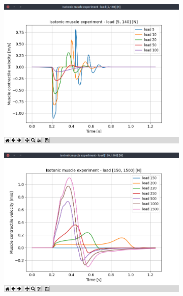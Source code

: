 \documentclass{cmc}
\begin{document}
\begin{figure}[H]
    \centering
    \begin{subfigure}[b]{0.49\textwidth}
        \includegraphics[width=\textwidth,trim={0.5cm 1.25cm 1.5cm 1.5cm},clip]{1d/isotonic_small_load.png}
    \end{subfigure}
    \begin{subfigure}[b]{0.49\textwidth}
        \includegraphics[width=\textwidth,trim={0.5cm 1.25cm 1.5cm 1.5cm},clip]{1d/isotonic_big_load.png}
    \end{subfigure}

\end{figure}
\end{document}
